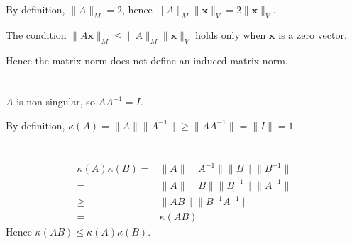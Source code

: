 \documentclass{article}
\begin{document}
By definition, $\|A\|_M = 2$, hence $\|A\|_M \|\boldsymbol{x}\|_V = 2 \|\boldsymbol{x}\|_V$.

The condition $\|A\boldsymbol{x}\|_M \leq \|A\|_M \|\boldsymbol{x}\|_V$ holds only when $\boldsymbol{x}$ is
a zero vector.

Hence the matrix norm does not define an induced matrix norm.

\section{}
$A$ is non-singular, so $AA^{-1} = I$.

By definition, $\kappa(A) = \|A\| \|A^{-1}\| \geq \|A
	A^{-1}\| = \| I \| = 1$.

\section{}
\begin{align*}
	\kappa(A) \kappa(B) = & \|A\| \|A^{-1}\| \|B\| \|B^{-1}\| \\
	=                     & \|A\| \|B\| \|B^{-1}\| \|A^{-1}\| \\
	\geq                  & \| A B \| \| B^{-1} A^{-1} \|     \\
	=                     & \kappa(AB)
\end{align*}
Hence $\kappa(AB) \leq \kappa(A) \kappa(B)$.
\end{document}
